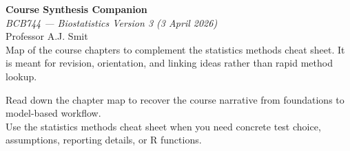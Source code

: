 \documentclass[9pt]{article}
\newlength{\tableblockwidth}
\newlength{\tableoffset}
\newlength{\headerleftwidth}
\newlength{\headergap}
\newlength{\headerrightwidth}
\begin{document}
\noindent\hspace*{\tableoffset}%
\begin{minipage}{\tableblockwidth}
\begin{minipage}[t]{\headerleftwidth}
  \vspace{0pt}
  \raggedright
  {\Huge\sffamily\bfseries\color{headbg} Course Synthesis Companion}\\
  {\large\itshape BCB744 --- Biostatistics Version 3 (3 April 2026)}\\
  {\small Professor A.J. Smit}\\
  {\small Map of the course chapters to complement the statistics methods cheat sheet. It is meant for revision, orientation, and linking ideas rather than rapid method lookup.}
\end{minipage}%
\hspace*{\headergap}%
\begin{minipage}[t]{\headerrightwidth}
  \vspace*{-1.5mm}
  \begin{summarybox}
    \small\sffamily
    Read down the chapter map to recover the course narrative from foundations to model-based workflow.\\
    Use the statistics methods cheat sheet when you need concrete test choice, assumptions, reporting details, or R functions.
  \end{summarybox}
\end{minipage}
\end{minipage}
\end{document}
